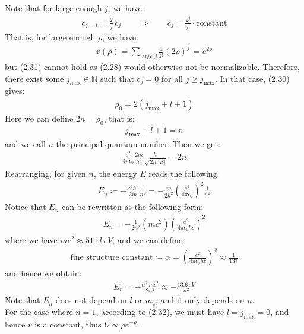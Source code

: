 \documentclass[11pt]{book}
\theoremstyle{break}
\theoremstyle{break}
\newcommand{\N}{\mathbb{N}}
\begin{document}
Note that for large enough $j$, we have:
\begin{align*}
c_{j+1} = \frac{2}{j}\, c_j \qquad \Rightarrow \qquad c_j = \frac{2^j}{j!} \cdot \text{constant}
\end{align*}
That is, for large enough $\rho$, we have:
\begin{align}
v(\rho) = \sum_{\text{large }j} \frac{1}{j!}(2\rho)^j \,= e^{2\rho}
\end{align}
but (2.31) cannot hold as (2.28) would otherwise not be normalizable. Therefore, there exist some $j_{\max} \in \N$ such that $c_{j} = 0$ for all $j \geq j_{\max}$. In that case, (2.30) gives:
\begin{align*}
\rho_0 = 2(j_{\max} + l+1)
\end{align*}
Here we can define $2n= \rho_0$, that is: 
\begin{align}
j_{\max} +l + 1 =n
\end{align} 
and we call $n$ the principal quantum number. Then we get:
\begin{align*}
\frac{e^2}{4\pi \epsilon_0} \frac{2m}{\hbar^2} \frac{\hbar}{\sqrt{2m |E|}} = 2n
\end{align*}
Rearranging, for given $n$, the energy $E$ reads the following:
\begin{align*}
E_n\coloneqq  -\frac{\kappa^2 \hbar^2}{2m} \frac{1}{n^2} = -\frac{m}{2\hbar^2}\left( \frac{e^2}{4\pi \epsilon_0}\right)^2 \frac{1}{n^2}
\end{align*}
Notice that $E_n$ can be rewritten as the following form:
\begin{align*}
E_n  = -\frac{1}{2n^2} \left( mc^2\right) \left( \frac{e^2}{4\pi \epsilon_0 \hbar c}\right)^2
\end{align*}
where we have $mc^2  \approx 511\, keV$, and we can define:
\begin{align*}
\text{fine structure constant}\coloneqq \alpha = \left( \frac{e^2}{4\pi \epsilon_0 \hbar c}\right)^2 \approx \frac{1}{137}
\end{align*}
and hence we obtain:
\begin{align*}
E_n = -\frac{\alpha^2\, mc^2}{2n^2} \approx - \frac{13.6\, eV}{n^2}
\end{align*}
Note that $E_n$ does not depend on $l$ or $m_z$, and it only depends on $n$. \\

For the case where $n = 1$, according to (2.32), we must have $l=j_{\max}=0$, and hence $v$ is a constant, thus $U \propto \rho e^{-\rho}$. \\
\end{document}
